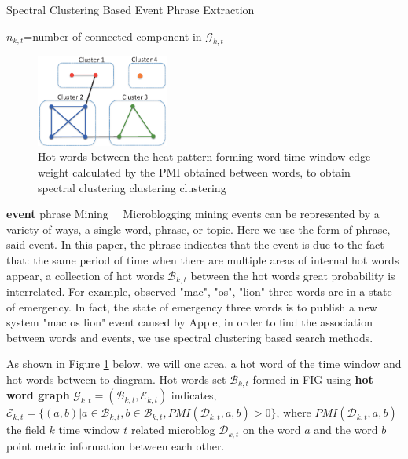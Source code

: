 \documentclass[conference,compsoc]{IEEEtran}
\begin{document}
\begin{algorithm}
\label{alg:eventKeywordsSearchMethod}
\caption{Spectral Clustering Based Event Phrase Extraction}
\label{alg:eventKeywordsSearchMethod}
\(n_{k,t}\)=number of connected component in \(\mathcal{G}_{k,t}\)\\
\end{algorithm}


\begin{figure}
\centering
\includegraphics[height=3cm]{img/wordClusterGraph.eps}
\caption{Hot words between the heat pattern forming word time window edge weight calculated by the PMI obtained between words, to obtain spectral clustering clustering clustering}
\label{fig: windowsBurstyWordGraph}
\end{figure}

\textbf{event} phrase Mining
\ \ Microblogging mining events can be represented by a variety of ways, a single word, phrase, or topic.
Here we use the form of phrase, said event.
In this paper, the phrase indicates that the event is due to the fact that: the same period of time when there are multiple areas of internal hot words appear, a collection of hot words \(\mathcal{B}_{k, t} \) between the hot words great probability is interrelated. For example, observed "mac", "os", "lion" three words are in a state of emergency.
In fact, the state of emergency three words is to publish a new system "mac os lion" event caused by Apple, in order to find the association between words and events, we use spectral clustering based search methods.

As shown in Figure \ref{fig: windowsBurstyWordGraph} below, we will one area, a hot word of the time window and hot words between to diagram.
Hot words set \(\mathcal{B}_{k, t} \) formed in FIG using \textbf{hot word graph} \(\mathcal{G}_{k, t} = (\mathcal{B}_{k, t}, \mathcal{E}_{k, t}) \) indicates,
\(\mathcal{E}_{k, t} = \{(a, b) | a \in \mathcal{B}_{k, t}, b \in \mathcal{B}_{k, t }, PMI (\mathcal{D}_{k, t}, a, b)> 0 \} \), where \(PMI (\mathcal{D}_{k, t}, a, b) \) the field \(k \) time window \(t \) related microblog \(\mathcal{D}_{k, t} \) on the word \(a\) and the word \(b\) point metric information between each other.
\end{document}
